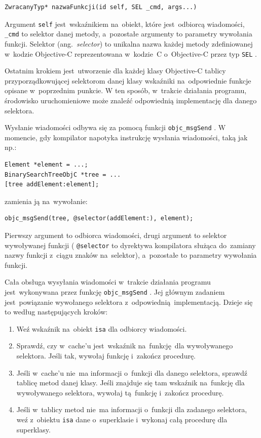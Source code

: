 \documentclass[mgr, shortabstract]{iithesis}
\newcommand{\ang}[1]{ang.~\textit{#1}}
\newcommand{\objcinline}[1]{
    \texttt{#1}
}
\begin{document}
\begin{verbatim}
ZwracanyTyp* nazwaFunkcji(id self, SEL _cmd, args...)
\end{verbatim}

Argument \objcinline{self} jest~wskaźnikiem na~obiekt, które jest~odbiorcą wiadomości, \objcinline{_cmd} to selektor danej metody, a~pozostałe argumenty to parametry wywołania funkcji. Selektor (\ang{selector}) to unikalna nazwa każdej metody zdefiniowanej w~kodzie Objective-C reprezentowana w~kodzie~C o~Objective-C przez typ \objcinline{SEL}.

Ostatnim krokiem jest~utworzenie dla każdej klasy Objective-C tablicy przyporządkowującej selektorom danej klasy wskaźniki na~odpowiednie funkcje opisane w~poprzednim punkcie. W ten sposób, w~trakcie działania programu, środowisko uruchomieniowe może znaleźć odpowiednią implementację dla danego selektora.

Wysłanie wiadomości odbywa się za pomocą funkcji \objcinline{objc_msgSend}. W momencie, gdy kompilator napotyka instrukcję wysłania wiadomości, taką jak np.:

\begin{verbatim}
Element *element = ...;
BinarySearchTreeObjC *tree = ...
[tree addElement:element];
\end{verbatim}

zamienia ją na~wywołanie:

\begin{verbatim}
objc_msgSend(tree, @selector(addElement:), element);
\end{verbatim}

Pierwszy argument to odbiorca wiadomości, drugi argument to selektor wywoływanej funkcji (\objcinline{@selector} to dyrektywa kompilatora służąca do~zamiany nazwy funkcji z~ciągu znaków na~selektor), a~pozostałe to parametry wywołania funkcji.

Cała obsługa wysyłania wiadomości w~trakcie działania programu jest~wykonywana przez funkcję \objcinline{objc_msgSend}. Jej głównym zadaniem jest~powiązanie wywołanego selektora z~odpowiednią implementacją. Dzieje się to według następujących kroków:

\begin{enumerate}
    \item Weź wskaźnik na~obiekt \objcinline{isa} dla odbiorcy wiadomości.
    \item Sprawdź, czy w~cache'u jest~wskaźnik na~funkcję dla wywoływanego selektora. Jeśli tak, wywołaj funkcję i~zakończ procedurę.
    \item Jeśli w~cache'u nie~ma informacji o~funkcji dla danego selektora, sprawdź tablicę metod danej klasy. Jeśli znajduje się tam wskaźnik na~funkcję dla wywoływanego selektora, wywołaj tą funkcję i~zakończ procedurę.
    \item Jeśli w~tablicy metod nie~ma informacji o~funkcji dla zadanego selektora, weź z~obiektu \objcinline{isa} dane o~superklasie i~wykonaj całą procedurę dla superklasy.
\end{enumerate}
\end{document}
